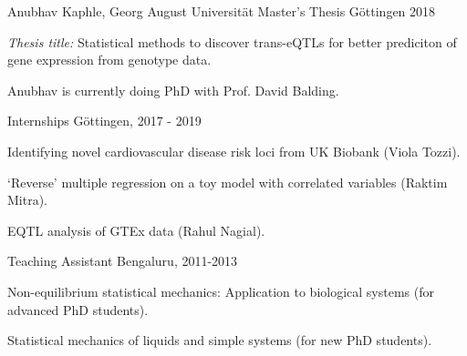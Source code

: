 


\begin{cventries}


\cventry
{Anubhav Kaphle, Georg August Universität} %
{Master's Thesis} %
{Göttingen} %
{2018} %
{ %
\begin{cvitems}
\item {{\itshape{Thesis title:}} Statistical methods to discover trans-eQTLs for better prediciton of gene expression from genotype data.}
\item {Anubhav is currently doing PhD with Prof. David Balding.}
\end{cvitems}
}


\cventry
{} %
{Internships} %
{Göttingen, 2017 - 2019} %
{} %
{ %
\begin{cvitems}
\item {Identifying novel cardiovascular disease risk loci from UK Biobank (Viola Tozzi).}
\item {`Reverse' multiple regression on a toy model with correlated variables (Raktim Mitra).}
\item {EQTL analysis of GTEx data (Rahul Nagial).}
\end{cvitems}
}


\cventry
{} %
{Teaching Assistant} %
{Bengaluru, 2011-2013} %
{} %
{ %
\begin{cvitems}
\item {Non-equilibrium statistical mechanics: Application to biological systems (for advanced PhD students).}
\item {Statistical mechanics of liquids and simple systems (for new PhD students).}
\end{cvitems}
}


\end{cventries}
